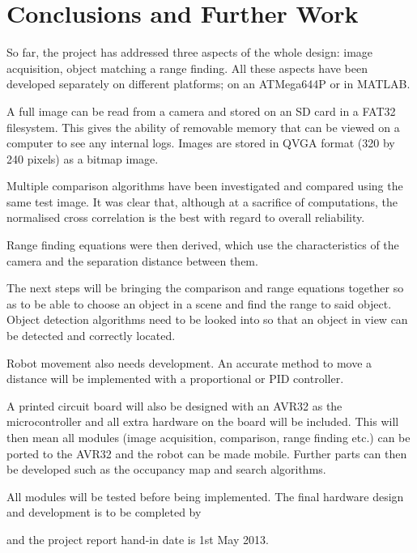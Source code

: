\chapter{Conclusions and Further Work} \label{Chapter: Conclusions}

So far, the project has addressed three aspects of the whole design: image acquisition, object matching a range finding. All these aspects have been developed separately on different platforms; on an ATMega644P or in MATLAB. 

A full image can be read from a camera and stored on an SD card in a FAT32 filesystem. This gives the ability of removable memory that can be viewed on a computer to see any internal logs. Images are stored in QVGA format (320 by 240 pixels) as a bitmap image. 

Multiple comparison algorithms have been investigated and compared using the same test image. It was clear that, although at a sacrifice of computations, the normalised cross correlation is the best with regard to overall reliability.

Range finding equations were then derived, which use the characteristics of the camera and the separation distance between them. 

The next steps will be bringing the comparison and range equations together so as to be able to choose an object in a scene and find the range to said object. Object detection algorithms need to be looked into so that an object in view can be detected and correctly located. 

Robot movement also needs development. An accurate method to move a distance will be implemented with a proportional or PID controller. 

A printed circuit board will also be designed with an AVR32 as the microcontroller and all extra hardware on the board will be included. This will then mean all modules (image acquisition, comparison, range finding etc.) can be ported to the AVR32 and the robot can be made mobile. Further parts can then be developed such as the occupancy map and search algorithms. 

All modules will be tested before being implemented. The final hardware design and development is to be completed by \date{15th March 2013} and the project report hand-in date is 1st May 2013. 